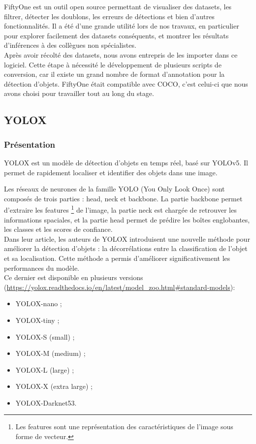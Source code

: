 FiftyOne est un outil open source permettant de visualiser des datasets, les filtrer,
détecter les doublons, les erreurs de détections et bien d'autres fonctionnalités.
Il a été d'une grande utilité lors de nos travaux, en particulier pour explorer facilement
des datasets conséquents, et montrer les résultats d'inférences
à des collègues non spécialistes.\\

Après avoir récolté des datasets, nous avons entrepris de les importer dans ce logiciel. Cette étape à
nécessité le développement de plusieurs scripts de conversion, car il existe un grand nombre de format
d'annotation pour la détection d'objets. FiftyOne était compatible avec COCO, c'est celui-ci que nous
avons choisi pour travailler tout au long du stage.\\

\subsection{YOLOX}\label{yolox}

\subsubsection{Présentation}

YOLOX est un modèle de détection d'objets en temps réel, basé sur YOLOv5. Il permet de rapidement
localiser et identifier des objets dans une image.

Les réseaux de neurones de la famille YOLO (You Only Look Once) sont composés de trois parties
\cite{Redmon_Farhadi_2018} : head, neck et backbone.
La partie backbone permet d'extraire les features \footnote{Les features sont une représentation des
caractéristiques de l'image sous forme de vecteur.} de l'image, la partie neck est chargée de retrouver les informations spaciales,
et la partie head permet de prédire les boîtes englobantes, les classes et les scores de confiance.\\

Dans leur article, les auteurs de YOLOX \cite{Ge_Liu_Wang_Li_Sun_2021} introduisent une nouvelle méthode
pour améliorer la détection d'objets : la décorrélations entre la classification de l'objet et
sa localisation. Cette méthode a permis d'améliorer significativement les performances du modèle.\\

Ce dernier est disponible en plusieurs versions (\url{https://yolox.readthedocs.io/en/latest/model_zoo.html#standard-models}):
\begin{itemize}
    \item YOLOX-nano ;
    \item YOLOX-tiny ;
    \item YOLOX-S (small) ;
    \item YOLOX-M (medium) ;
    \item YOLOX-L (large) ;
    \item YOLOX-X (extra large) ;
    \item YOLOX-Darknet53.
\end{itemize}

